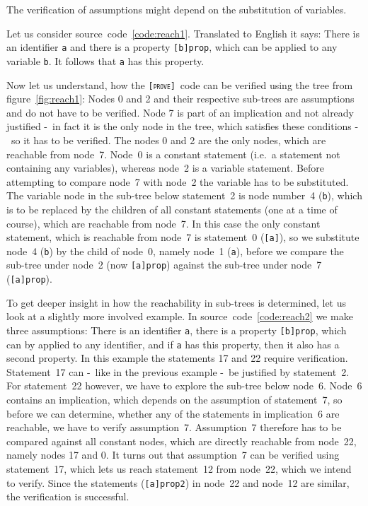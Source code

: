 \documentclass[british]{article}
\newcommand\prv{bc}
\newcommand\m[1]{\texttt{#1}}
\newcommand\name{\texttt{\textsc{[prove]}}}
\begin{document}
The verification of assumptions might depend on the substitution of variables.
\newline

Let us consider source~code~\ref{code:reach1}. Translated to English it says:
There is an identifier \m{a} and there is a property \m{[b]prop}, which can be
applied to any variable \m{b}. It follows that \m{a} has this property.
\newline

Now let us understand, how the \name\ code can be verified using the tree from
figure~\ref{fig:reach1}: Nodes 0 and 2 and their respective sub-trees are
assumptions and do not have to be verified. Node 7 is part of an implication
and not already justified -\ in fact it is the only node in the tree, which
satisfies these conditions -\ so it has to be verified. The nodes 0 and 2 are
the only nodes, which are reachable from node~7. Node~0 is a constant statement
(i.e.\ a statement not containing any variables), whereas node~2 is a variable
statement. Before attempting to compare node~7 with node~2 the variable has to
be substituted. The variable node in the sub-tree below statement~2 is node
number~4 (\m{b}), which is to be replaced by the children of all constant
statements (one at a time of course), which are reachable from node~7. In this
case the only constant statement, which is reachable from node~7 is statement~0
(\m{[a]}), so we substitute node~4 (\m{b}) by the child of node~0, namely node~1
(\m{a}), before we compare the sub-tree under node~2 (now \m{[a]prop}) against
the sub-tree under node~7 (\m{[a]prop}).
\newline

To get deeper insight in how the reachability in sub-trees is determined, let us
look at a slightly more involved example. In source~code~\ref{code:reach2} we
make three assumptions: There is an identifier \m{a}, there is a property
\m{[b]prop}, which can by applied to any identifier, and if \m{a} has this
property, then it also has a second property. In this example the statements 17
and 22 require verification. Statement~17 can -\ like in the previous example -\
be justified by statement~2. For statement~22 however, we have to explore the
sub-tree below node~6. Node~6 contains an implication, which depends on the
assumption of statement~7, so before we can determine, whether any of the
statements in implication~6 are reachable, we have to verify assumption~7.
Assumption~7 therefore has to be compared against all constant nodes, which are
directly reachable from node~22, namely nodes 17 and 0. It turns out that
assumption~7 can be verified using statement~17, which lets us reach
statement~12 from node~22, which we intend to verify. Since the statements
(\m{[a]prop2}) in node~22 and node~12 are similar, the verification is
successful.
\end{document}
